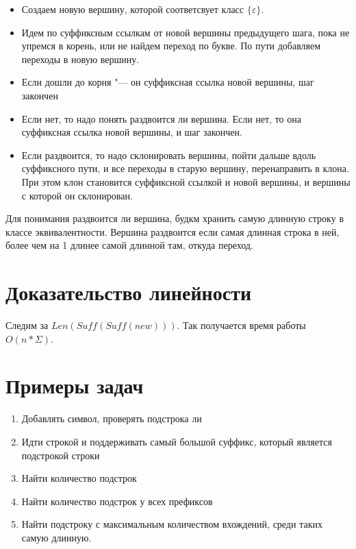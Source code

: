 \documentclass[12pt,a4paper]{article}
\theoremstyle{plain}
\begin{document}
\begin{itemize}
\item Создаем новую вершину, которой соответсвует класс $\{\varepsilon\}$.
\item Идем по суффиксным ссылкам от новой вершины предыдущего шага, пока не упремся в корень, или не найдем переход по букве.
По пути добавляем переходы в новую вершину.
\item Если дошли до корня "--- он суффиксная ссылка новой вершины, шаг закончен
\item Если нет, то надо понять раздвоится ли вершина. Если нет, то она суффиксная ссылка новой вершины, и шаг закончен.
\item Если раздвоится, то надо склонировать вершины, пойти дальше вдоль суффиксного пути, и все переходы в старую вершину, перенаправить
в клона. При этом клон становится суффиксной ссылкой и новой вершины, и вершины с которой он склонирован.
\end{itemize}

Для понимания раздвоится ли вершина, будкм хранить самую длинную строку в классе эквивалентности.
Вершина раздвоится если самая длинная строка в ней, более чем на 1 длинее самой длинной там, откуда переход.

\section{Доказательство линейности}

Следим за $Len(Suff(Suff(new)))$. Так получается время работы $O(n*\Sigma)$.

\section{Примеры задач}

\begin{enumerate}
\item Добавлять символ, проверять подстрока ли
\item Идти строкой и поддерживать самый большой суффикс, который является подстрокой строки
\item Найти количество подстрок               
\item Найти количество подстрок у всех префиксов
\item Найти подстроку с максимальным количеством вхождений, среди таких самую длинную.
\end{enumerate}
\end{document}
